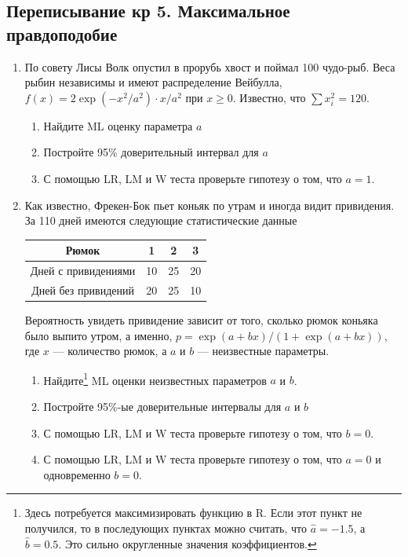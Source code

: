 \documentclass[12pt, a4paper]{article}
\begin{document}
\subsection{Переписывание кр 5. Максимальное правдоподобие}

\begin{enumerate}
\item  По совету Лисы Волк опустил в прорубь хвост и поймал 100 чудо-рыб. Веса рыбин независимы и имеют распределение Вейбулла, $f(x)=2\exp(-x^2/a^2)\cdot x/a^2$ при $x\geq 0$. Известно, что $\sum x_i^2=120$.
\begin{enumerate}
\item Найдите ML оценку параметра $a$
\item Постройте 95\% доверительный интервал для $a$
\item С помощью LR, LM и W теста проверьте гипотезу о том, что $a=1$.
\end{enumerate}

\item Как известно, Фрекен-Бок пьет коньяк по утрам и иногда видит привидения. За 110 дней имеются следующие статистические данные


\begin{tabular}{c|ccc}
Рюмок & 1 & 2 & 3 \\
\hline
Дней с привидениями & 10 & 25 & 20 \\
Дней без привидений & 20 &  25 & 10 \\
\end{tabular}

Вероятность увидеть привидение зависит от того, сколько рюмок коньяка было выпито утром, а именно, $p=\exp(a+bx)/(1+ \exp(a+bx))$, где $x$ — количество рюмок, а $a$ и $b$ — неизвестные параметры.
\begin{enumerate}
\item Найдите\footnote{Здесь потребуется максимизировать функцию в R. Если этот пункт не получился, то в последующих пунктах можно считать, что $\hat{a}=-1.5$, а $\hat{b}=0.5$. Это сильно округленные значения коэффициентов.} ML оценки неизвестных параметров $a$ и $b$.
\item Постройте 95\%-ые доверительные интервалы для $a$ и $b$
\item С помощью LR, LM и W теста проверьте гипотезу о том, что $b=0$.
\item С помощью LR, LM и W теста проверьте гипотезу о том, что $a=0$ и одновременно $b=0$.
\end{enumerate}

\end{enumerate}
\end{document}
